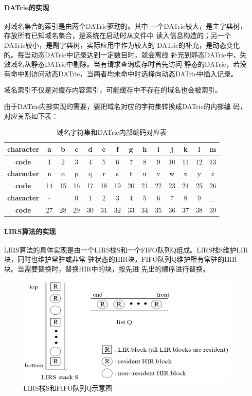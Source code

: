 \paragraph{DATrie的实现\\[5pt]}
	对域名集合的索引是由两个DATrie驱动的。其中
	一个DATrie较大，是主字典树，存放所有已知域名集合，是系统在启动时从文件中
	读入信息构造的；另一个DATrie较小，是副字典树，实际应用中作为较大的
	DATrie的补充，是动态变化的。每当动态DATrie中记录达到一定数目时，就会离线
	补充到静态DATrie中，失效域名从静态DATrie中剔除。当有请求查询缓存时首先访问
	静态的DATrie，若没有命中则访问动态DATrie，当两者均未命中时选择向动态DATrie中插入记录。
	\par
	 {域名索引不仅是对缓存内容索引，可能缓存中不存在的域名也会被索引。 }
	 \par{由于DATrie内部实现的需要，要把域名对应的字符集转换成DATrie的内部编
	 码，对应关系如下表：}

\begin{table}[H]
\centering
\begin{tabular}{*{14}{|c}|}
\hline
\textbf{character}&a&b&c&d&e&f&g&h&i&j&k&l&m\\
\hline
\textbf{code}&1&2&3&4&5&6&7&8&9&10&11&12&13\\
\hline
\textbf{character}&n&o&p&q&r&s&t&u&v&w&x&y&z\\
\hline
\textbf{code}&14&15&16&17&18&19&20&21&22&23&24&25&26\\
\hline
\textbf{character}&-&.&0&1&2&3&4&5&6&7&8&9&\_\\
\hline
\textbf{code}&27&28&29&30&31&32&33&34&35&36&37&38&39\\
\hline
\end{tabular}
\caption{域名字符集和DATrie内部编码对应表}
\end{table}


\paragraph{LIRS算法的实现\\[5pt]}
LIRS算法的具体实现是由一个LIRS栈S和一个FIFO队列Q组成。LIRS栈S维护LIR块，同时也维护常驻或非常
驻状态的HIR块，FIFO队列Q维护所有常驻的HIR块。当需要替换时，替换HIR中的块，按先进
先出的顺序进行替换。
\begin{figure}[H]
\centering
\includegraphics[keepaspectratio, scale=0.4]{pitures/lirsstack.png}
\caption{LIRS栈S和FIFO队列Q示意图} 
\end{figure}


